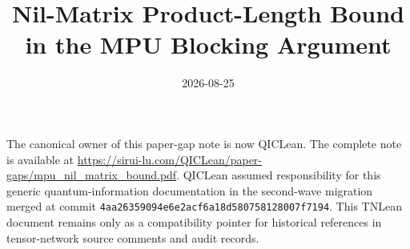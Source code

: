 \documentclass{article}
\title{Nil-Matrix Product-Length Bound in the MPU Blocking Argument}
\author{}
\date{2026-08-25}
\begin{document}
\maketitle
{}

The canonical owner of this paper-gap note is now QICLean. The complete note is
available at
\url{https://sirui-lu.com/QICLean/paper-gaps/mpu_nil_matrix_bound.pdf}.
QICLean assumed responsibility for this generic quantum-information
documentation in the second-wave migration merged at commit
\texttt{4aa26359094e6e2acf6a18d580758128007f7194}. This TNLean document remains
only as a compatibility pointer for historical references in tensor-network
source comments and audit records.
\end{document}
